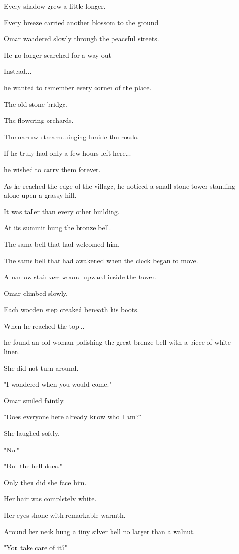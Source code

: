 \documentclass[12pt,openany]{book}
\begin{document}
Every shadow grew a little longer.

Every breeze carried another blossom to the ground.

Omar wandered slowly through the peaceful streets.

He no longer searched for a way out.

Instead...

he wanted to remember every corner of the place.

The old stone bridge.

The flowering orchards.

The narrow streams singing beside the roads.

If he truly had only a few hours left here...

he wished to carry them forever.

As he reached the edge of the village, he noticed a small stone tower standing alone upon a grassy hill.

It was taller than every other building.

At its summit hung the bronze bell.

The same bell that had welcomed him.

The same bell that had awakened when the clock began to move.

A narrow staircase wound upward inside the tower.

Omar climbed slowly.

Each wooden step creaked beneath his boots.

When he reached the top...

he found an old woman polishing the great bronze bell with a piece of white linen.

She did not turn around.

"I wondered when you would come."

Omar smiled faintly.

"Does everyone here already know who I am?"

She laughed softly.

"No."

"But the bell does."

Only then did she face him.

Her hair was completely white.

Her eyes shone with remarkable warmth.

Around her neck hung a tiny silver bell no larger than a walnut.

"You take care of it?"
\end{document}
